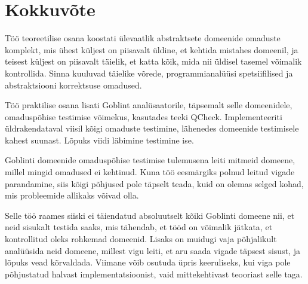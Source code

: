 \documentclass[../thesis.tex]{subfiles}
\begin{document}
\section*{Kokkuvõte}

Töö teoreetilise osana koostati ülevaatlik abstraktsete domeenide omaduste komplekt, mis ühest küljest on piisavalt üldine, et kehtida mistahes domeenil, ja teisest küljest on piisavalt täielik, et katta kõik, mida nii üldisel tasemel võimalik kontrollida. Sinna kuuluvad täielike võrede, programmianalüüsi spetsiifilised ja abstraktsiooni korrektsuse omadused.

Töö praktilise osana lisati Goblint analüsaatorile, täpsemalt selle domeenidele, omaduspõhise testimise võimekus, kasutades teeki QCheck. Implementeeriti üldrakendataval viisil kõigi omaduste testimine, lähenedes domeenide testimisele kahest suunast. Lõpuks viidi läbimine testimine ise.

Goblinti domeenide omaduspõhise testimise tulemusena leiti mitmeid domeene, millel mingid omadused ei kehtinud. Kuna töö eesmärgiks polnud leitud vigade parandamine, siis kõigi põhjused pole täpselt teada, kuid on olemas selged kohad, mis probleemide allikaks võivad olla.

Selle töö raames siiski ei täiendatud absoluutselt kõiki Goblinti domeene nii, et neid sisukalt testida saaks, mis tähendab, et tööd on võimalik jätkata, et kontrollitud oleks rohkemad domeenid. Lisaks on muidugi vaja põhjalikult analüüsida neid domeene, millest vigu leiti, et aru saada vigade täpsest sisust, ja lõpuks vead kõrvaldada. Viimane võib osutuda üpris keeruliseks, kui viga pole põhjustatud halvast implementatsioonist, vaid mittekehtivast teooriast selle taga.

\end{document}
